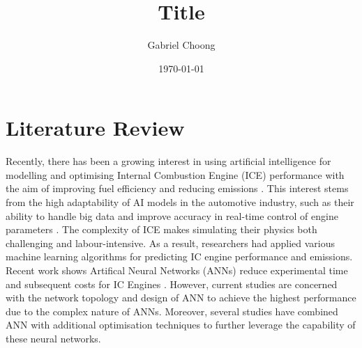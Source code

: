 \documentclass[a4paper, 12pt]{article}
\title{Title}
\author{Gabriel Choong}
\date{\today}
\begin{document}
  \maketitle




  \section{Literature Review}
  Recently, there has been a growing interest in using artificial intelligence for modelling and optimising Internal Combustion Engine (ICE) performance with the aim of improving fuel efficiency and reducing emissions \parencite{karunamurthyPredictionICEngine2023}. This interest stems from the high adaptability of AI models in the automotive industry, such as their ability to handle big data and improve accuracy in real-time control of engine parameters \parencite{inezahavugimanaReviewArtificialIntelligent2023}. The complexity of ICE makes simulating their physics both challenging and labour-intensive. As a result, researchers had applied various machine learning algorithms for predicting IC engine performance and emissions. Recent work shows Artifical Neural Networks (ANNs) reduce experimental time and subsequent costs for IC Engines \parencite{bhattApplicationArtificialNeural2022, tuanhoangReviewApplicationArtificial2021}. However, current studies are concerned with the network topology and design of ANN to achieve the highest performance due to the complex nature of ANNs. Moreover, several studies have combined ANN with additional optimisation techniques to further leverage the capability of these neural networks. \\
\end{document}
